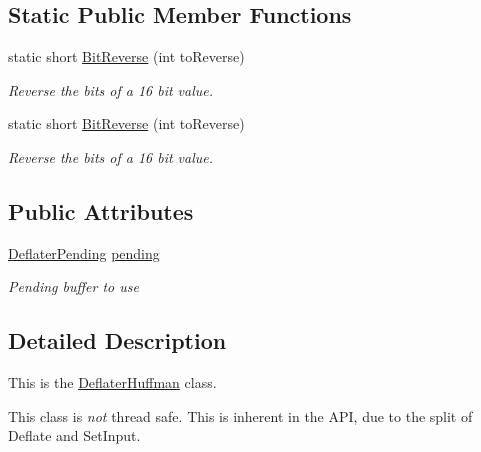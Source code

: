 \subsection*{Static Public Member Functions}
\begin{DoxyCompactItemize}
\item 
static short \hyperlink{class_i_c_sharp_code_1_1_sharp_zip_lib_1_1_zip_1_1_compression_1_1_deflater_huffman_acebc37393bce183e37ca6693f66e8949}{Bit\+Reverse} (int to\+Reverse)
\begin{DoxyCompactList}\small\item\em Reverse the bits of a 16 bit value. \end{DoxyCompactList}\item 
static short \hyperlink{class_i_c_sharp_code_1_1_sharp_zip_lib_1_1_zip_1_1_compression_1_1_deflater_huffman_acebc37393bce183e37ca6693f66e8949}{Bit\+Reverse} (int to\+Reverse)
\begin{DoxyCompactList}\small\item\em Reverse the bits of a 16 bit value. \end{DoxyCompactList}\end{DoxyCompactItemize}
\subsection*{Public Attributes}
\begin{DoxyCompactItemize}
\item 
\hyperlink{class_i_c_sharp_code_1_1_sharp_zip_lib_1_1_zip_1_1_compression_1_1_deflater_pending}{Deflater\+Pending} \hyperlink{class_i_c_sharp_code_1_1_sharp_zip_lib_1_1_zip_1_1_compression_1_1_deflater_huffman_ab905a4997487a36bab2c23abefa1d50a}{pending}
\begin{DoxyCompactList}\small\item\em Pending buffer to use \end{DoxyCompactList}\end{DoxyCompactItemize}


\subsection{Detailed Description}
This is the \hyperlink{class_i_c_sharp_code_1_1_sharp_zip_lib_1_1_zip_1_1_compression_1_1_deflater_huffman}{Deflater\+Huffman} class. 

This class is {\itshape not} thread safe. This is inherent in the A\+PI, due to the split of Deflate and Set\+Input.


